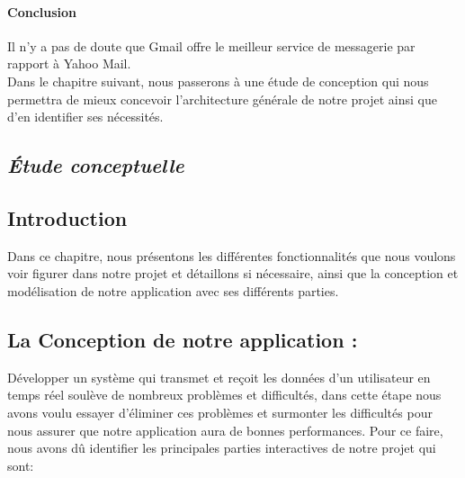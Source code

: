 \documentclass[french]{report}
\begin{document}
\begin{titlepage}
\subsubsection{\LARGE Conclusion}
\LARGE Il n'y a pas de doute que Gmail offre le meilleur service de messagerie par rapport à Yahoo Mail.\\
Dans le chapitre suivant, nous passerons à une étude de conception qui nous permettra de mieux concevoir l'architecture générale de notre projet ainsi que d'en identifier ses nécessités.
\end{titlepage}
\begin{titlepage}
\pagestyle{fancy}
\chapter{
\textit{ Étude conceptuelle }
}
\renewcommand*{\thepage}{\arabic{page}}%
\setcounter{page}{30}%
\newpage
\section{\huge Introduction}     
\LARGE Dans ce chapitre, nous présentons les différentes fonctionnalités que nous voulons voir figurer dans notre projet et détaillons si nécessaire, ainsi que la conception et modélisation de notre application avec ses différents parties.\\
\section{\huge La Conception de notre application :}
\LARGE Développer un système qui transmet et reçoit les données d'un utilisateur en temps réel soulève de nombreux problèmes et difficultés, dans cette étape nous avons voulu essayer d'éliminer ces problèmes et surmonter les difficultés pour nous assurer que notre application aura de bonnes performances.
Pour ce faire, nous avons dû identifier les principales parties interactives de notre projet qui sont: \\

\end{titlepage}
\end{document}
